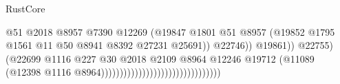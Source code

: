 \begin{lexlean}{RustCore}
\begin{coremodule}
                                                                        @51
                                                                        @2018
                                                                        @8957
                                                                        @7390
                                                                        @12269
                                                                        (@19847
                                                                          @1801
                                                                          @51
                                                                          @8957
                                                                          (@19852
                                                                            @1795
                                                                            @1561
                                                                            @11
                                                                            @50
                                                                            @8941
                                                                            @8392
                                                                            @27231
                                                                            @25691))
                                                                        @22746))
                                                                    @19861))
                                                                @22755)
                                                              (@22699
                                                                @1116
                                                                @227
                                                                @30
                                                                @2018
                                                                @2109
                                                                @8964
                                                                @12246
                                                                @19712
                                                                (@11089
                                                                  (@12398
                                                                    @1116
                                                                    @8964))))))))))))))))))))))))))))))))

\end{coremodule}
\end{lexlean}

